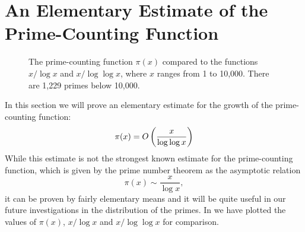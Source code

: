\section{An Elementary Estimate of the Prime-Counting Function}

\begin{figure}[t]
  \centering
  \caption[The prime-counting function]{\label{figure:prime-counting-data}The prime-counting function $\pi(x)$ compared to the functions $x/\log x$ and $x/\log\log x$, where $x$ ranges from 1 to 10,000. There are 1,229 primes below 10,000.}
\end{figure}

In this section we will prove an elementary estimate for the growth of the prime-counting function:
\begin{equation*}
  \pi(x)=O\left(\frac{x}{\log\log x}\right)
\end{equation*}
While this estimate is not the strongest known estimate for the prime-counting function, which is given by the prime number theorem as the asymptotic relation
\begin{equation*}
  \pi(x)\sim\frac{x}{\log x},
\end{equation*}
it can be proven by fairly elementary means and it will be quite useful in our future investigations in the distribution of the primes. In  we have plotted the values of $\pi(x)$, $x/\log x$ and $x/\log\log x$ for comparison.

